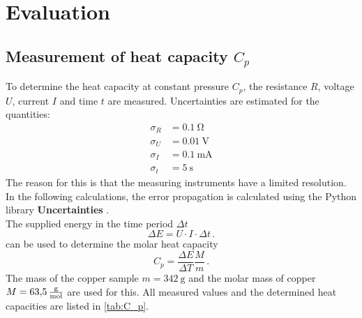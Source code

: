 \section{Evaluation}
\label{sec:evaluation}


\subsection{Measurement of heat capacity $C_p$}
To determine the heat capacity at constant pressure $C_p$, the resistance $R$, voltage $U$, current $I$ and time $t$ are measured.
Uncertainties are estimated for the quantities:
\begin{align*}
    \sigma_R &= \qty{0.1}{\ohm} \\
    \sigma_U &= \qty{0.01}{\volt}\\
    \sigma_I &= \qty{0.1}{\milli\ampere} \\
    \sigma_t &= \qty{5}{\second}
\end{align*}
The reason for this is that the measuring instruments have a limited resolution.
In the following calculations, the error propagation is calculated using the Python library \textbf{Uncertainties} \cite{uncertainties}.
\\
The supplied energy in the time period $\Delta t$
\begin{equation}
    \Delta E = U \cdot I \cdot \Delta t \, .
\end{equation}
can be used to determine the molar heat capacity
\begin{equation}
    C_p = \frac{\Delta E}{\Delta T} \frac{M}{m} \,.
\end{equation}
The mass of the copper sample $m = \qty{342}{\gram}$ \cite{V47} and the molar mass of copper $M = \qty{63.5}{\frac{\gram}{\mol}}$ \cite{goodfellow} are used for this.
All measured values and the determined heat capacities are listed in \autoref{tab:C_p}.
